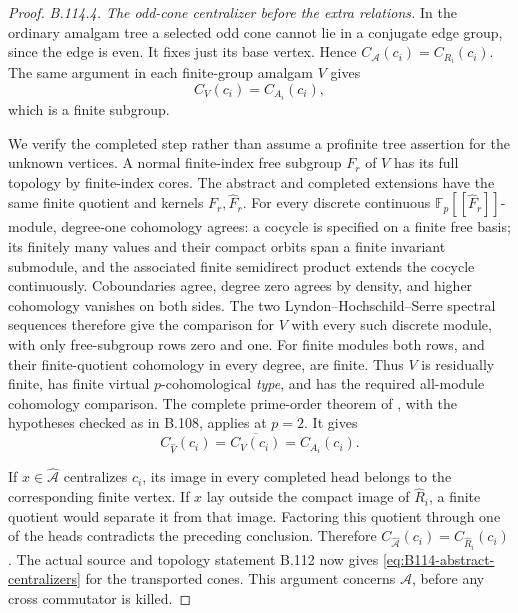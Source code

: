 \begin{proof}
\emph{B.114.4. The odd-cone centralizer before the extra relations.}
In the ordinary amalgam tree a selected odd cone cannot lie in a
conjugate edge group, since the edge is even. It fixes just its
base vertex. Hence
$C_{\mathcal A}(c_i)=C_{R_i}(c_i)$.
The same argument in each finite-group amalgam $V$ gives
\[
 C_V(c_i)=C_{A_i}(c_i),
\]
which is a finite subgroup.

We verify the completed step rather than assume a profinite tree
assertion for the unknown vertices. A normal finite-index free
subgroup $F_r$ of $V$ has its full topology by finite-index cores.
The abstract and completed extensions have the same finite
quotient and kernels $F_r,\widehat F_r$. For every discrete
continuous $\mathbb F_p[[\widehat F_r]]$-module, degree-one
cohomology agrees: a cocycle is specified on a finite free basis;
its finitely many values and their compact orbits span a finite
invariant submodule, and the associated finite semidirect product
extends the cocycle continuously. Coboundaries agree, degree zero
agrees by density, and higher cohomology vanishes on both sides.
The two Lyndon--Hochschild--Serre spectral sequences therefore
give the comparison for $V$ with every such discrete module,
with only free-subgroup rows zero and one. For finite modules
both rows, and their finite-quotient cohomology in every degree,
are finite. Thus $V$ is residually finite, has finite virtual
$p$-cohomological \emph{type}, and has the required all-module
cohomology comparison. The complete prime-order theorem of
\citet[Theorem~4.3, Sections~4.1--4.2]{BoggiZalesskii2025},
with the hypotheses checked as in B.108, applies at $p=2$.
It gives
\[
 C_{\widehat V}(c_i)=\overline{C_V(c_i)}=C_{A_i}(c_i).
\]

If $x\in\widehat{\mathcal A}$ centralizes $c_i$, its image in
every completed head belongs to the corresponding finite vertex.
If $x$ lay outside the compact image of $\widehat R_i$, a finite
quotient would separate it from that image. Factoring this quotient
through one of the heads contradicts the preceding conclusion.
Therefore $C_{\widehat{\mathcal A}}(c_i)=C_{\widehat R_i}(c_i)$.
The actual source and topology statement B.112 now gives
\eqref{eq:B114-abstract-centralizers} for the transported cones.
This argument concerns $\mathcal A$, before any cross commutator
is killed.


\end{proof}
